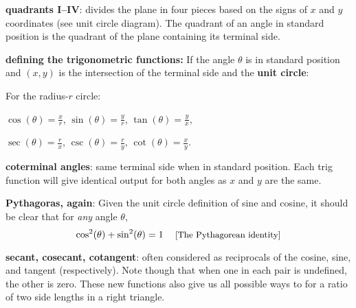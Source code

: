 \documentclass{amsbook}
\numberwithin{section}{chapter}
\numberwithin{equation}{chapter}
\newcommand{\ds}{\displaystyle}
\begin{document}
\textbf{quadrants I--IV}: divides the plane in four pieces based on the signs of $x$ and $y$ coordinates (see unit circle diagram). The quadrant of an angle in standard position is the quadrant of the plane containing its terminal side.

		\medskip {}
		\textbf{defining the trigonometric functions: }If the angle $\theta$ is in standard position and $(x,y)$ is the intersection of the terminal side and the \textbf{unit circle}:\\
		
		
		\bigskip For the radius-$r$ circle:
		
		\smallskip
		$\cos(\theta) = \ds \frac{x}{r}$,  $\sin(\theta) = \ds \frac{y}{r}$, $\tan(\theta) = \ds \frac{y}{x}$,
		
		$\sec(\theta) = \ds \frac{r}{x}$,  $\csc(\theta) = \ds \frac{r}{y}$, $\cot(\theta) = \ds \frac{x}{y}$.
		
\textbf{coterminal angles}: same terminal side when in standard position. Each trig function will give identical output for both angles as $x$ and $y$ are the same.
		
\textbf{Pythagoras, again}: Given the unit circle definition of sine and cosine, it should be clear that for \textit{any} angle $\theta$, $$\cos^2(\theta) + \sin^2(\theta) = 1 \text{\small \ \ \ \ [The Pythagorean identity]}$$
		
\textbf{secant, cosecant, cotangent}: often considered as reciprocals of the cosine, sine, and tangent (respectively). Note though that when one in each pair is undefined, the other is zero. These new functions also give us all possible ways to for a ratio of two side lengths in a right triangle.
\end{document}
